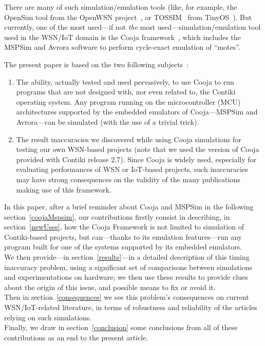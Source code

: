 \documentclass[10pt]{ewsn-proc}
\begin{document}
There are many of such simulation/emulation tools (like, for example,
the OpenSim tool from the OpenWSN project~\cite{OpenWSN}, or
TOSSIM~\cite{TOSSIM} from TinyOS~\cite{TinyOS}). But currently,
one of the most used---if not \emph{the} most used---simulation/emulation
tool used in the WSN/IoT domain is the Cooja framework~\cite{Cooja}, which
includes the MSPSim and Avrora software to perform cycle-exact emulation
of ``motes''.

\medskip

The present paper is based on the two following subjects~:
\begin{enumerate}

\item The ability, actually tested and used pervasively, to use Cooja
to run programs that are not designed with, nor even related to, the
Contiki operating system. Any program running on the microcontroller
(MCU) architectures supported by the embedded emulators of Cooja---MSPSim
and Avrora---can be simulated (with the use of a trivial trick).

\item The result inaccuracies we discovered while using Cooja simulations
for testing our own WSN-based projects (note that we used the version of
Cooja provided with Contiki release 2.7). Since Cooja is widely used,
 especially for evaluating performances of WSN or IoT-based projects,
such inaccuracies may have strong consequences on the validity of
the many publications making use of this framework.

\end{enumerate}

\medskip

In this paper, after a brief reminder about Cooja and MSPSim in the
following section~\ref{coojaMspsim}, our contributions firstly consist
in describing, in section~\ref{newUses}, how the Cooja Framework is not
limited to simulation of Contiki-based projects, but can---thanks to
its emulation features---run any program built for one of the systems
supported by its embedded emulators. \\
We then provide---in section~\ref{results}---in a detailed description
of this timing inaccuracy problem, using a significant set of comparisons
between simulations and experimentations on hardware; we then use
these results to provide clues about the origin of this issue, and
possible means to fix or avoid it. \\
Then in section~\ref{consequences} we see this problem's consequences
on current WSN/IoT-related literature, in terms of robustness and
reliability of the articles relying on such simulations. \\
Finally, we draw in section~\ref{conclusion} some conclusions from all
of these contributions as an end to the present article.
\end{document}
